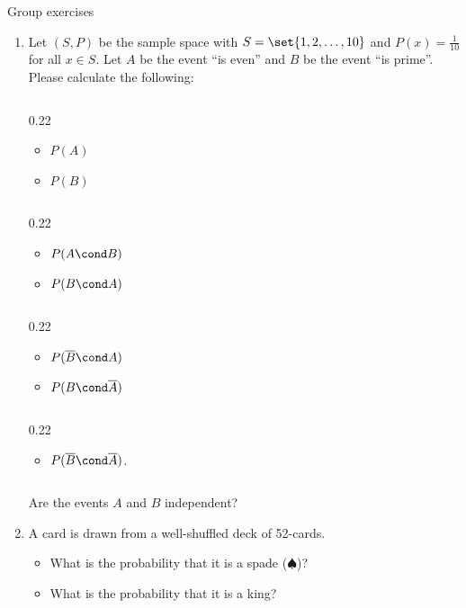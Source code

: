 \documentclass[10pt]{beamer}
\begin{document}
\begin{frame}{Group exercises}

\begin{enumerate}
	\item Let $(S,P)$ be the sample space with $S=\set{1,2,\hdots, 10}$ and $P(x) =\frac{1}{10}$ for all $x \in S$.  Let $A$ be the event \enquote{is even} and $B$ be the event \enquote{is prime}.  Please calculate the following:
	\vspace{-0.5cm}
    \begin{columnsonlytextwidth}
    \begin{column}[t]{0.22\textwidth}
        \begin{itemize} \small
		\item[a.)] $P(A)$ 
		\item[b.)] $P(B)$
        \end{itemize}
    \end{column}
    \begin{column}[t]{0.22\textwidth}
        \begin{itemize} \small
      	\item[c.)] $P(A \cond B)$
		\item[d.)] $P(B \cond A)$ 
        \end{itemize}
    \end{column}
     \begin{column}[t]{0.22\textwidth}
        \begin{itemize} \small
		\item[e.)] $P(\overline{B} \cond A)$ 
		\item[f.)] $P(B \cond \overline{A})$
        \end{itemize}
    \end{column}
    \begin{column}[t]{0.22\textwidth}
        \begin{itemize} \small
		\item[g.)] $P(\overline{B} \cond \overline{A})$. 
        \end{itemize}
    \end{column}
    \end{columnsonlytextwidth}
    \vspace{.2cm}
     Are the events $A$ and $B$ independent?
\item A card is drawn from a well-shuffled deck of 52-cards.
	\begin{itemize}
	\item[a.] What is the probability that it is a spade ($\spadesuit$)?
	\item[b.] What is the probability that it is a king?	

\end{itemize}
\end{enumerate}
\end{frame}
\end{document}
